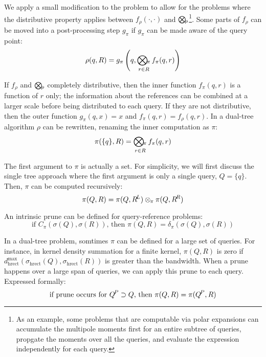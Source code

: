 \documentclass[times, 10pt,twocolumn]{article}
\DeclareMathOperator{\hrect}{hrect}
\newcommand{\kdleft}{\hspace{-0.02in}^L}
\newcommand{\kdright}{\hspace{-0.02in}^R}
\newcommand{\kdparent}{\hspace{-0.02in}^P}
\newcommand{\myOp}[1]{\mathop{\bigotimes\nolimits\hspace{-0.045in}_{#1}}}
\newcommand{\myop}[1]{\otimes\hspace{-0.04in}_{#1}\hspace{0.03in}}
\newcommand{\allpi}{\pi}
\newcommand{\Oppi}{\myOp{\allpi}}
\newcommand{\oppi}{\myop{\allpi}}
\newcommand{\fpi}{f_{\allpi}}
\newcommand{\gpi}{g_{\allpi}}
\newcommand{\canprunepi}{C_{\allpi}}
\newcommand{\deltapi}{\delta_{\allpi}}
\newcommand{\allrho}{\rho}
\newcommand{\Oprho}{\myOp{\rho}}
\newcommand{\frho}{f_{\rho}}
\newcommand{\allsigma}{\sigma}
\begin{document}
We apply a small modification to the problem to allow for the problems where the distributive property applies between $\frho(\cdot, \cdot)$ and $\Oprho$\footnote{As an example, some problems that are computable via polar expansions can accumulate the multipole moments first for an entire subtree of queries, propgate the moments over all the queries, and evaluate the expression independently for each query.}.
Some parts of $\frho$ can be moved into a post-processing step $\gpi$ if $\gpi$ can be made aware of the query point:
\begin{equation}
\allrho(q, R) = \gpi \left(q, \Oppi_{r \in R} \fpi(q, r) \right)
\end{equation}

\noindent If $\frho$ and $\Oprho$ completely distributive, then the inner function $\fpi(q, r)$ is a function of $r$ only; the information about the references can be combined at a larger scale before being distributed to each query.
If they are not distributive, then the outer function $\gpi(q, x) = x$ and $\fpi(q, r) = \frho(q, r)$.
In a dual-tree algorithm $\allrho$ can be rewritten, renaming the inner computation as $\allpi$:
\begin{equation}
\allpi(\{q\}, R) = \Oppi_{r \in R} \fpi(q, r)
\label{eqn:defpi}
\end{equation}

\noindent The first argument to $\allpi$ is actually a set.
For simplicity, we will first discuss the single tree approach where the first argument is only a single query, $Q = \{q\}$.
Then, $\allpi$ can be computed recursively:
\begin{equation}
\allpi(Q, R) = \allpi(Q, R\kdleft) \oppi \allpi(Q, R\kdright)
\label{eqn:dividepi}
\end{equation}

\noindent An intrinsic prune can be defined for query-reference problems:
\begin{equation}
\text{if } \canprunepi(\allsigma(Q), \allsigma(R)) \text{, then } \allpi(Q, R) = \deltapi(\allsigma(Q), \allsigma(R))
\label{eqn:prunepi}
\end{equation}

In a dual-tree problem, somtimes $\allpi$ can be defined for a large set of queries.
For instance, in kernel density summation for a finite kernel, $\allpi(Q, R)$ is zero if $d^{\max}_{\hrect}(\allsigma_{\hrect}(Q), \allsigma_{\hrect}(R))$ is greater than the bandwidth.
When a prune happens over a large span of queries, we can apply this prune to each query.
Expressed formally:
\begin{equation}
\text{if prune occurs for } Q\kdparent \supset Q \text{, then } \allpi(Q, R) = \allpi(Q\kdparent, R)
\label{eqn:parentpi}
\end{equation}
\end{document}
